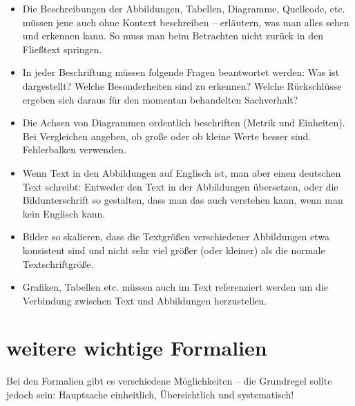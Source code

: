 \begin{itemize}
\item Die Beschreibungen der Abbildungen, Tabellen, Diagramme, Quellcode, etc. müssen jene auch ohne Kontext beschreiben -- erläutern, was man alles sehen und erkennen kann. So muss man beim Betrachten nicht zurück in den Fließtext springen.
\item In jeder Beschriftung müssen folgende Fragen beantwortet werden: Was ist dargestellt? Welche Besonderheiten sind zu erkennen? Welche Rückschlüsse ergeben sich daraus für den momentan behandelten Sachverhalt?
\item Die Achsen von Diagrammen ordentlich beschriften (Metrik und Einheiten). Bei Vergleichen angeben, ob große oder ob kleine Werte besser sind. Fehlerbalken verwenden.
\item Wenn Text in den Abbildungen auf Englisch ist, man aber einen deutschen Text schreibt: Entweder den Text in der Abbildungen übersetzen, oder die Bildunterschrift so gestalten, dass man das auch verstehen kann, wenn man kein Englisch kann.
\item Bilder so skalieren, dass die Textgrößen verschiedener Abbildungen etwa konsistent sind und nicht sehr viel größer (oder kleiner) als die normale Textschriftgröße.
\item Grafiken, Tabellen etc. müssen auch im Text referenziert werden um die Verbindung zwischen Text und Abbildungen herzustellen.
\end{itemize}

\section{weitere wichtige Formalien}

Bei den Formalien gibt es verschiedene Möglichkeiten -- die Grundregel sollte jedoch sein: Hauptsache einheitlich, Übersichtlich und systematisch!

